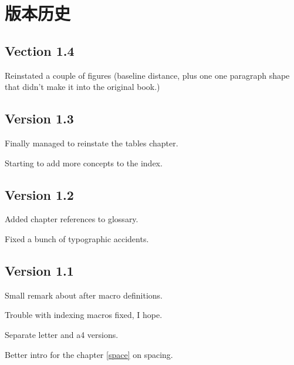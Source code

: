 \documentclass{book}
\begin{document}
\chapter*{版本历史}

\section*{Vection 1.4}

Reinstated a couple of figures (baseline distance,
plus one one paragraph shape that didn't make it
into the original book.)

\section*{Version 1.3}

Finally managed to reinstate the tables chapter.

Starting to add more concepts to the index.

\section*{Version 1.2}

Added chapter references to glossary.

Fixed a bunch of typographic accidents.

\section*{Version 1.1}

Small remark about  after macro definitions.

Trouble with indexing macros fixed, I hope.

Separate letter and a4 versions.

Better intro for the chapter \ref{space} on spacing.
\end{document}
